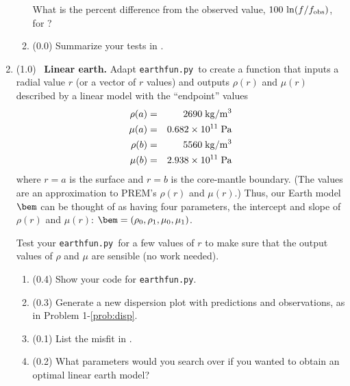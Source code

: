 \documentclass[11pt,titlepage,fleqn]{article}
\newcommand{\tfileef}{{\tt earthfun.py}}
\begin{document}
\begin{enumerate}
\begin{enumerate}
What is the percent difference from the observed value, $100\,\ln(f/f_{\rm obs})$, for ?

\item (0.0) Summarize your tests in .
\end{enumerate}

\label{prob:earth_homo}


\pagebreak
\item (1.0) \ptag\ {\bf Linear earth.} Adapt \tfileef\ to create a function that inputs a radial value $r$ (or a vector of $r$ values) and outputs $\rho(r)$ and $\mu(r)$ described by a linear model with the ``endpoint'' values
%
\begin{eqnarray*}
\rho(a) &=& 2690 \; {\rm kg/m^3}
\\
\mu(a) &=& 0.682 \times 10^{11} \; {\rm Pa}
\\
\rho(b) &=& 5560 \; {\rm kg/m^3}
\\
\mu(b) &=& 2.938 \times 10^{11} \; {\rm Pa}
\end{eqnarray*}
%
where $r=a$ is the surface and $r=b$ is the core-mantle boundary. (The values are an approximation to PREM's $\rho(r)$ and $\mu(r)$.) Thus, our Earth model $\bem$ can be thought of as having four parameters, the intercept and slope of $\rho(r)$ and $\mu(r)$: $\bem = (\rho_0,\rho_1,\mu_0,\mu_1)$.

Test your \tfileef\ for a few values of $r$ to make sure that the output values of $\rho$ and $\mu$ are sensible (no work needed).


\begin{enumerate}
\item (0.4) Show your code for \tfileef.
\item (0.3) Generate a new dispersion plot with predictions and observations, as in Problem 1-\ref{prob:disp}.
\item (0.1) List the misfit in .
\item (0.2) What parameters would you search over if you wanted to obtain an optimal linear earth model?
\end{enumerate}

\label{prob:earth_linear}



\end{enumerate}
\end{document}
